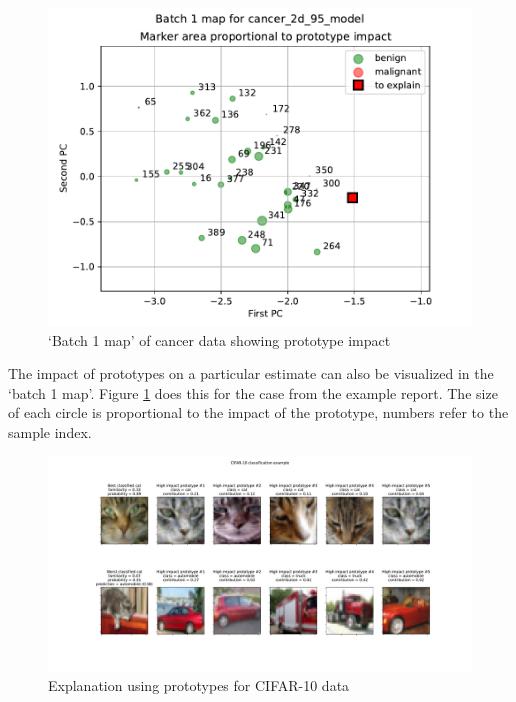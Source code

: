 %
\begin{figure}
\caption{`Batch 1 map' of cancer data showing prototype impact}
\label{fig_batch_1_map_impact}
%
\begin{center}
\includegraphics[height=0.4\textheight]{figures/cancer_batch_1_map_impact.pdf}
\end{center}
\end{figure}
%
The impact of prototypes on a particular estimate can also be visualized in the `batch 1 map'.
Figure \ref{fig_batch_1_map_impact} does this for the case from the example report.
The size of each circle is proportional to the impact of the prototype, numbers refer to the sample index.\par
%
\begin{figure}
\caption{Explanation using prototypes for CIFAR-10 data}
\label{fig_prototypes_cifar-10}
%
\begin{center}
\includegraphics[width=0.9\textheight, angle=90, trim={1.5cm 1.5cm 1.5cm 0.5cm}, clip]{figures/cifar-10_model_explain.pdf}
\end{center}
\end{figure}
